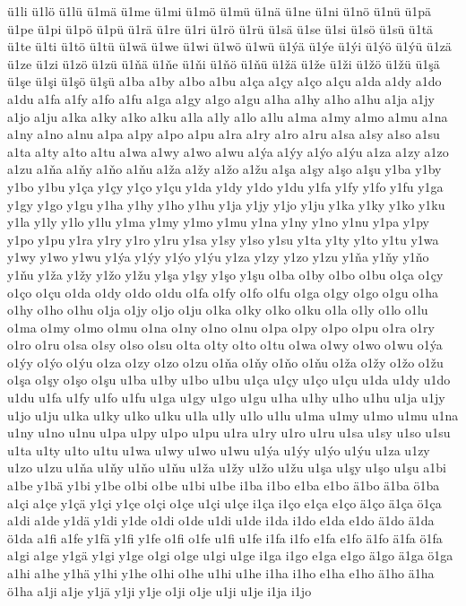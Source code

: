 {ü1li
ü1lö
ü1lü
ü1mä
ü1me
ü1mi
ü1mö
ü1mü
ü1nä
ü1ne
ü1ni
ü1nö
ü1nü
ü1pä
ü1pe
ü1pi
ü1pö
ü1pü
ü1rä
ü1re
ü1ri
ü1rö
ü1rü
ü1sä
ü1se
ü1si
ü1sö
ü1sü
ü1tä
ü1te
ü1ti
ü1tö
ü1tü
ü1wä
ü1we
ü1wi
ü1wö
ü1wü
ü1ýä
ü1ýe
ü1ýi
ü1ýö
ü1ýü
ü1zä
ü1ze
ü1zi
ü1zö
ü1zü
ü1ňä
ü1ňe
ü1ňi
ü1ňö
ü1ňü
ü1žä
ü1že
ü1ži
ü1žö
ü1žü
ü1şä
ü1şe
ü1şi
ü1şö
ü1şü
a1ba
a1by
a1bo
a1bu
a1ça
a1çy
a1ço
a1çu
a1da
a1dy
a1do
a1du
a1fa
a1fy
a1fo
a1fu
a1ga
a1gy
a1go
a1gu
a1ha
a1hy
a1ho
a1hu
a1ja
a1jy
a1jo
a1ju
a1ka
a1ky
a1ko
a1ku
a1la
a1ly
a1lo
a1lu
a1ma
a1my
a1mo
a1mu
a1na
a1ny
a1no
a1nu
a1pa
a1py
a1po
a1pu
a1ra
a1ry
a1ro
a1ru
a1sa
a1sy
a1so
a1su
a1ta
a1ty
a1to
a1tu
a1wa
a1wy
a1wo
a1wu
a1ýa
a1ýy
a1ýo
a1ýu
a1za
a1zy
a1zo
a1zu
a1ňa
a1ňy
a1ňo
a1ňu
a1ža
a1žy
a1žo
a1žu
a1şa
a1şy
a1şo
a1şu
y1ba
y1by
y1bo
y1bu
y1ça
y1çy
y1ço
y1çu
y1da
y1dy
y1do
y1du
y1fa
y1fy
y1fo
y1fu
y1ga
y1gy
y1go
y1gu
y1ha
y1hy
y1ho
y1hu
y1ja
y1jy
y1jo
y1ju
y1ka
y1ky
y1ko
y1ku
y1la
y1ly
y1lo
y1lu
y1ma
y1my
y1mo
y1mu
y1na
y1ny
y1no
y1nu
y1pa
y1py
y1po
y1pu
y1ra
y1ry
y1ro
y1ru
y1sa
y1sy
y1so
y1su
y1ta
y1ty
y1to
y1tu
y1wa
y1wy
y1wo
y1wu
y1ýa
y1ýy
y1ýo
y1ýu
y1za
y1zy
y1zo
y1zu
y1ňa
y1ňy
y1ňo
y1ňu
y1ža
y1žy
y1žo
y1žu
y1şa
y1şy
y1şo
y1şu
o1ba
o1by
o1bo
o1bu
o1ça
o1çy
o1ço
o1çu
o1da
o1dy
o1do
o1du
o1fa
o1fy
o1fo
o1fu
o1ga
o1gy
o1go
o1gu
o1ha
o1hy
o1ho
o1hu
o1ja
o1jy
o1jo
o1ju
o1ka
o1ky
o1ko
o1ku
o1la
o1ly
o1lo
o1lu
o1ma
o1my
o1mo
o1mu
o1na
o1ny
o1no
o1nu
o1pa
o1py
o1po
o1pu
o1ra
o1ry
o1ro
o1ru
o1sa
o1sy
o1so
o1su
o1ta
o1ty
o1to
o1tu
o1wa
o1wy
o1wo
o1wu
o1ýa
o1ýy
o1ýo
o1ýu
o1za
o1zy
o1zo
o1zu
o1ňa
o1ňy
o1ňo
o1ňu
o1ža
o1žy
o1žo
o1žu
o1şa
o1şy
o1şo
o1şu
u1ba
u1by
u1bo
u1bu
u1ça
u1çy
u1ço
u1çu
u1da
u1dy
u1do
u1du
u1fa
u1fy
u1fo
u1fu
u1ga
u1gy
u1go
u1gu
u1ha
u1hy
u1ho
u1hu
u1ja
u1jy
u1jo
u1ju
u1ka
u1ky
u1ko
u1ku
u1la
u1ly
u1lo
u1lu
u1ma
u1my
u1mo
u1mu
u1na
u1ny
u1no
u1nu
u1pa
u1py
u1po
u1pu
u1ra
u1ry
u1ro
u1ru
u1sa
u1sy
u1so
u1su
u1ta
u1ty
u1to
u1tu
u1wa
u1wy
u1wo
u1wu
u1ýa
u1ýy
u1ýo
u1ýu
u1za
u1zy
u1zo
u1zu
u1ňa
u1ňy
u1ňo
u1ňu
u1ža
u1žy
u1žo
u1žu
u1şa
u1şy
u1şo
u1şu
a1bi
a1be
y1bä
y1bi
y1be
o1bi
o1be
u1bi
u1be
i1ba
i1bo
e1ba
e1bo
ä1bo
ä1ba
ö1ba
a1çi
a1çe
y1çä
y1çi
y1çe
o1çi
o1çe
u1çi
u1çe
i1ça
i1ço
e1ça
e1ço
ä1ço
ä1ça
ö1ça
a1di
a1de
y1dä
y1di
y1de
o1di
o1de
u1di
u1de
i1da
i1do
e1da
e1do
ä1do
ä1da
ö1da
a1fi
a1fe
y1fä
y1fi
y1fe
o1fi
o1fe
u1fi
u1fe
i1fa
i1fo
e1fa
e1fo
ä1fo
ä1fa
ö1fa
a1gi
a1ge
y1gä
y1gi
y1ge
o1gi
o1ge
u1gi
u1ge
i1ga
i1go
e1ga
e1go
ä1go
ä1ga
ö1ga
a1hi
a1he
y1hä
y1hi
y1he
o1hi
o1he
u1hi
u1he
i1ha
i1ho
e1ha
e1ho
ä1ho
ä1ha
ö1ha
a1ji
a1je
y1jä
y1ji
y1je
o1ji
o1je
u1ji
u1je
i1ja
i1jo
}
